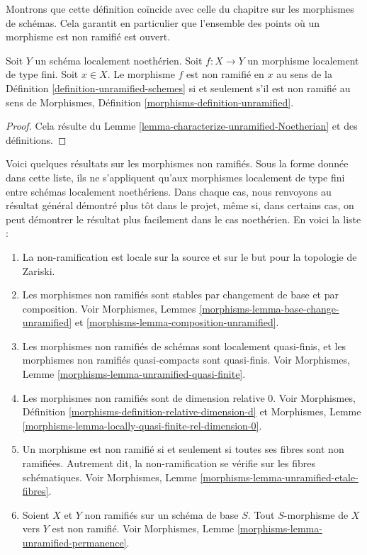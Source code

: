 \noindent
Montrons que cette définition coïncide avec celle du
chapitre sur les morphismes de schémas. Cela garantit en particulier que
l'ensemble des points où un morphisme est non ramifié est ouvert.

\begin{lemma}
\label{lemma-unramified-definition}
Soit $Y$ un schéma localement noethérien.
Soit $f : X \to Y$ un morphisme localement de type fini.
Soit $x \in X$. Le morphisme $f$ est non ramifié en $x$ au
sens de la Définition \ref{definition-unramified-schemes}
si et seulement s'il est non ramifié au
sens de Morphismes, Définition \ref{morphisms-definition-unramified}.
\end{lemma}

\begin{proof}
Cela résulte du Lemme \ref{lemma-characterize-unramified-Noetherian}
et des définitions.
\end{proof}

\noindent
Voici quelques résultats sur les morphismes non ramifiés.
Sous la forme donnée dans cette liste, ils ne s'appliquent qu'aux
morphismes localement de type fini entre schémas localement noethériens.
Dans chaque cas, nous renvoyons au résultat général
démontré plus tôt dans le projet, même si, dans certains cas, on peut
démontrer le résultat plus facilement dans le cas noethérien.
En voici la liste :
\begin{enumerate}
\item La non-ramification est locale sur la source et sur le but pour la
topologie de Zariski.
\item Les morphismes non ramifiés sont stables par changement de base et par composition.
Voir Morphismes, Lemmes \ref{morphisms-lemma-base-change-unramified}
et \ref{morphisms-lemma-composition-unramified}.
\item Les morphismes non ramifiés de schémas sont localement quasi-finis,
et les morphismes non ramifiés quasi-compacts sont quasi-finis.
Voir Morphismes, Lemme \ref{morphisms-lemma-unramified-quasi-finite}.
\item Les morphismes non ramifiés sont de dimension relative $0$. Voir
Morphismes, Définition \ref{morphisms-definition-relative-dimension-d}
et
Morphismes, Lemme \ref{morphisms-lemma-locally-quasi-finite-rel-dimension-0}.
\item Un morphisme est non ramifié si et seulement si toutes ses fibres sont non ramifiées.
Autrement dit, la non-ramification se vérifie sur les fibres schématiques. Voir
Morphismes, Lemme \ref{morphisms-lemma-unramified-etale-fibres}.
\item Soient $X$ et $Y$ non ramifiés sur un schéma de base $S$.
Tout $S$-morphisme de $X$ vers $Y$ est non ramifié.
Voir Morphismes, Lemme \ref{morphisms-lemma-unramified-permanence}.
\end{enumerate}

